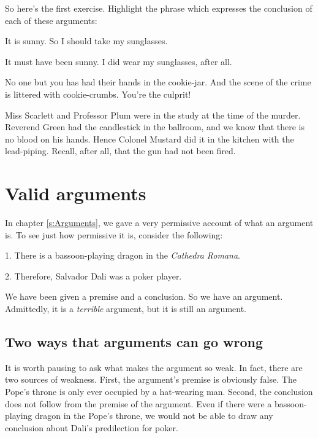 So here's the first exercise. Highlight the phrase which expresses the conclusion of each of these arguments:
\begin{earg}
	\item It is sunny. So I should take my sunglasses.
	\item It must have been sunny. I did wear my sunglasses, after all.
	\item No one but you has had their hands in the cookie-jar. And the scene of the crime is littered with cookie-crumbs. You're the culprit!
	\item Miss Scarlett and Professor Plum were in the study at the time of the murder. Reverend Green had the candlestick in the ballroom, and we know that there is no blood on his hands. Hence Colonel Mustard did it in the kitchen with the lead-piping. Recall, after all, that the gun had not been fired.
\end{earg}




\chapter{Valid arguments}
\label{s:Valid}

In chapter \ref{s:Arguments}, we gave a very permissive account of what an argument is. To see just how permissive it is, consider the following:
	\begin{earg}
		\item[1.] There is a bassoon-playing dragon in the \emph{Cathedra Romana}.
		\item[2.] Therefore, Salvador Dali was a poker player.
	\end{earg}
We have been given a premise and a conclusion. So we have an argument. Admittedly, it is a \emph{terrible} argument, but it is still an argument.

\section{Two ways that arguments can go wrong}

It is worth pausing to ask what makes the argument so weak. In fact, there are two sources of weakness. First, the argument's premise is obviously false. The Pope's throne is only ever occupied by a hat-wearing man. Second, the conclusion does not follow from the premise of the argument. Even if there were a bassoon-playing dragon in the Pope's throne, we would not be able to draw any conclusion about Dali's predilection for poker.

